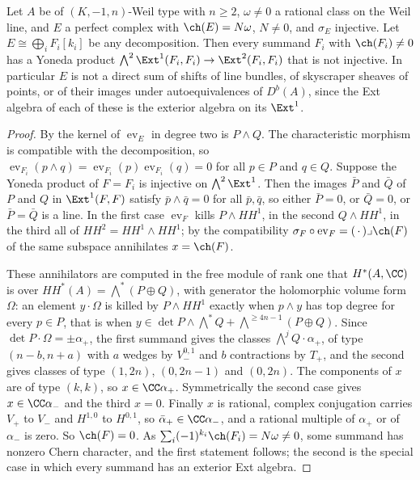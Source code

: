 \begin{theorem}\label{thm:nosum}
Let $A$ be of $(K,-1,n)$-Weil type with $n\ge2$, $\omega\ne0$ a rational class
on the Weil line, and $E$ a perfect complex with $\ch(E)=N\omega$, $N\ne0$, and
$\sigma_{E}$ injective. Let
$E\cong\bigoplus_{i}F_{i}[k_{i}]$ be any decomposition. Then every summand
$F_{i}$ with $\ch(F_{i})\ne0$ has a Yoneda product
$\bigwedge^{2}\Ext^{1}(F_{i},F_{i})\to\Ext^{2}(F_{i},F_{i})$ that is not
injective. In particular $E$ is not a direct sum of shifts of line bundles,
of skyscraper sheaves of points, or of their images under autoequivalences of
$D^{b}(A)$, since the Ext algebra of each of these is the exterior algebra on
its $\Ext^{1}$.
\end{theorem}

\begin{proof}
By \cite[Theorem~2.11(ii)]{paperII} the kernel of $\operatorname{ev}_{E}$ in degree
two is $P\wedge Q$. The characteristic morphism is compatible with the
decomposition, so $\operatorname{ev}_{F_{i}}(p\wedge q)=
\operatorname{ev}_{F_{i}}(p)\operatorname{ev}_{F_{i}}(q)=0$ for all
$p\in P$ and $q\in Q$. Suppose the Yoneda product of $F=F_{i}$ is injective on
$\bigwedge^{2}\Ext^{1}$. Then the images $\bar P$ and $\bar Q$ of $P$ and $Q$
in $\Ext^{1}(F,F)$ satisfy $\bar p\wedge\bar q=0$ for all $\bar p,\bar q$, so
either $\bar P=0$, or $\bar Q=0$, or $\bar P=\bar Q$ is a line. In the first
case $\operatorname{ev}_{F}$ kills $P\wedge HH^{1}$, in the second
$Q\wedge HH^{1}$, in the third all of $HH^{2}=HH^{1}\wedge HH^{1}$; by the
compatibility $\sigma_{F}\circ\operatorname{ev}_{F}=(\,\cdot\,)\lrcorner
\ch(F)$ of \cite[Setup~2.7]{paperII} the same subspace annihilates $x=\ch(F)$.

These annihilators are computed in the free module of rank one that
$H^{*}(A,\CC)$ is over $HH^{*}(A)=\bigwedge^{*}(P\oplus Q)$, with generator the
holomorphic volume form $\Omega$: an element $y\cdot\Omega$ is killed by
$P\wedge HH^{1}$ exactly when $p\wedge y$ has top degree for every $p\in P$,
that is when $y\in\det P\wedge\bigwedge^{*}Q+\bigwedge^{\ge4n-1}(P\oplus Q)$.
Since $\det P\cdot\Omega=\pm\alpha_{+}$, the first summand gives the classes
$\bigwedge^{j}Q\cdot\alpha_{+}$, of type $(n-b,n+a)$ with $a$ wedges by
$V_{-}^{0,1}$ and $b$ contractions by $T_{+}$, and the second gives classes of
type $(1,2n)$, $(0,2n-1)$ and $(0,2n)$. The components of $x$ are of type
$(k,k)$, so $x\in\CC\alpha_{+}$. Symmetrically the second case gives
$x\in\CC\alpha_{-}$ and the third $x=0$. Finally $x$ is
rational, complex conjugation carries $V_{+}$ to $V_{-}$ and $H^{1,0}$ to
$H^{0,1}$, so $\bar\alpha_{+}\in\CC\alpha_{-}$, and a rational multiple of
$\alpha_{+}$ or of $\alpha_{-}$ is zero. So $\ch(F)=0$. As
$\sum_{i}(-1)^{k_{i}}\ch(F_{i})=N\omega\ne0$, some summand has nonzero
Chern character, and the first statement follows; the second is the special
case in which every summand has an exterior Ext algebra.
\end{proof}
